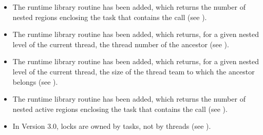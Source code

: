 \begin{itemize}
\item The  runtime library routine has been added, which 
      returns the number of nested  regions enclosing the task 
      that contains the call (see ).

\item The  runtime library routine has been 
      added, which returns, for a given nested level of the current thread, the 
      thread number of the ancestor 
      (see ).

\item The  runtime library routine has been added, which 
      returns, for a given nested level of the current thread, the size of the 
      thread team to which the ancestor belongs 
      (see ).

\item The  runtime library routine has been added, which
      returns the number of nested active  regions enclosing the 
      task that contains the call (see ).

\item In Version 3.0, locks are owned by tasks, not by threads 
      (see ).
\end{itemize}

